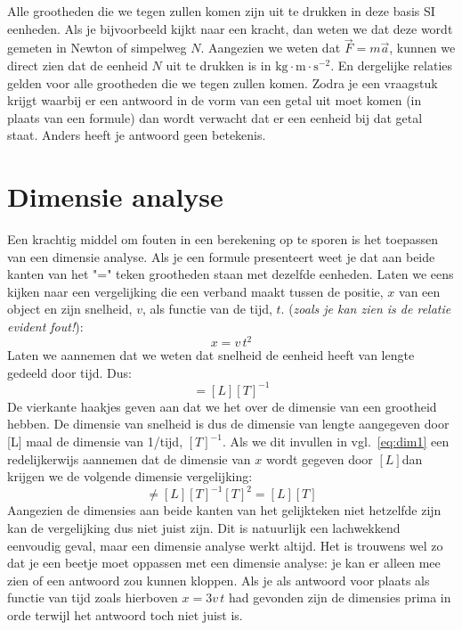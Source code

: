 Alle grootheden die we tegen zullen komen zijn uit te drukken in deze basis SI eenheden.
Als je bijvoorbeeld kijkt naar een kracht, dan weten we dat deze wordt gemeten in Newton
of simpelweg $N$. Aangezien we weten dat $\vec{F}=m\vec{a}$, kunnen we direct zien 
dat de eenheid $N$ uit te drukken is in $\mbox{kg}\cdot\mbox{m}\cdot\mbox{s}^{-2}$. En
dergelijke relaties gelden voor alle grootheden die we tegen zullen komen. Zodra je
een vraagstuk krijgt waarbij er een antwoord in de vorm van een getal uit moet komen
(in plaats van een formule) dan wordt verwacht dat er een eenheid bij dat getal
staat. Anders heeft je antwoord geen betekenis.

\section{Dimensie analyse}

Een krachtig middel om fouten in een berekening op te sporen is het toepassen van 
een dimensie analyse. Als je een formule presenteert weet je dat aan beide kanten
van het "=" teken grootheden staan met dezelfde eenheden. Laten we eens kijken
naar een vergelijking die een verband maakt tussen de positie, $x$ van een object en
zijn snelheid, $v$, als functie van de tijd, $t$. ({\it zoals je kan zien is de relatie evident fout!}):
\begin{equation}\label{eq:dim1}
x =  v\,t^2  
\end{equation}
Laten we aannemen dat we weten dat snelheid de eenheid heeft van lengte gedeeld 
door tijd. Dus:
\begin{equation}
[v]=[L][T]^{-1}
\end{equation}
De vierkante haakjes geven aan dat we het over de dimensie van een grootheid hebben. 
De dimensie van snelheid is dus de dimensie van lengte aangegeven door [L] maal
de dimensie van 1/tijd, $[T]^{-1}$. Als we dit invullen in vgl.~\ref{eq:dim1} een 
redelijkerwijs aannemen dat de dimensie van $x$ wordt gegeven door $[L]$dan krijgen 
we de volgende dimensie vergelijking:
\begin{equation}
[L] \neq [L][T]^{-1}[T]^{2}= [L][T] 
\end{equation}
Aangezien de dimensies aan beide kanten van het gelijkteken niet hetzelfde zijn kan de 
vergelijking dus niet juist zijn. Dit is natuurlijk een lachwekkend eenvoudig geval, maar
een dimensie analyse werkt altijd. Het is trouwens wel zo dat je een beetje moet oppassen
met een dimensie analyse: je kan er alleen mee zien of een antwoord zou kunnen kloppen. 
Als je als antwoord voor plaats als functie van tijd zoals hierboven $x=3v\,t$ had gevonden
zijn de dimensies prima in orde terwijl het antwoord toch niet juist is. 

